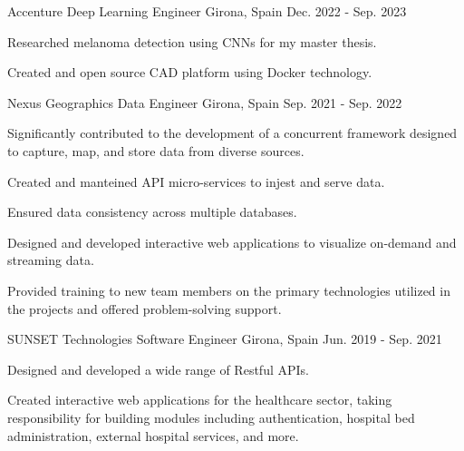 \begin{cventries}
    \cventry
    {Accenture} %
    {Deep Learning Engineer} %
    {Girona, Spain} %
    {Dec. 2022 - Sep. 2023} %
    {
    \begin{cvitems}
    \item{Researched melanoma detection using CNNs for my master thesis.}
    \item{Created and open source CAD platform using Docker technology.}
    \end{cvitems}
    }

      \cventry
      {Nexus Geographics} %
      {Data Engineer} %
      {Girona, Spain} %
      {Sep. 2021 - Sep. 2022} %
      {
        \begin{cvitems}
        \item {Significantly contributed to the development of a concurrent
          framework designed to capture, map, and store data from diverse
        sources.}
        \item {Created and manteined API micro-services to injest and serve data.}
        \item {Ensured data consistency across multiple databases.}
        \item {Designed and developed interactive web applications to visualize
          on-demand and streaming data.}
        \item {Provided training to new team members on the primary
          technologies utilized in the projects and offered problem-solving
        support.}
        \end{cvitems}
      }


      \cventry
      {SUNSET Technologies} %
      {Software Engineer} %
      {Girona, Spain} %
      {Jun. 2019 - Sep. 2021} %
      {
        \begin{cvitems}
        \item {Designed and developed a wide range of Restful APIs.}
        \item {Created interactive web applications for the healthcare sector,
          taking responsibility for building modules including authentication,
        hospital bed administration, external hospital services, and more.}
        \end{cvitems}
      }

  \end{cventries}

